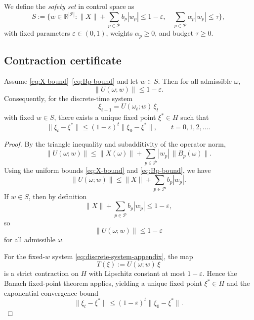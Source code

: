 \documentclass[11pt]{article}
\begin{document}
We define the \emph{safety set} in control space as
\begin{equation}
  S
  :=
  \biggl\{
    w\in\mathbb R^{|\mathcal P|}:
    \|X\| + \sum_{p\in\mathcal P} b_p |w_p| \le 1-\varepsilon,\quad
    \sum_{p\in\mathcal P} \alpha_p |w_p| \le \tau
  \biggr\},
  \label{eq:def-S}
\end{equation}
with fixed parameters $\varepsilon\in(0,1)$, weights $\alpha_p\ge 0$, and budget $\tau\ge 0$.

\subsection{Contraction certificate}

\begin{theorem}\label{thm:contraction}
Assume \eqref{eq:X-bound}--\eqref{eq:Bp-bound} and let $w\in S$. Then for all admissible $\omega$,
\begin{equation}
  \|U(\omega;w)\| \le 1-\varepsilon.
\end{equation}
Consequently, for the discrete-time system
\begin{equation}
  \xi_{t+1} = U(\omega_t;w)\,\xi_t
  \label{eq:discrete-system-appendix}
\end{equation}
with fixed $w\in S$, there exists a unique fixed point $\xi^\ast\in H$ such that
\[
\|\xi_t - \xi^\ast\|
\le (1-\varepsilon)^t \|\xi_0 - \xi^\ast\|,\qquad t=0,1,2,\dots.
\]
\end{theorem}

\begin{proof}
By the triangle inequality and subadditivity of the operator norm,
\[
\|U(\omega;w)\|
\le \|X(\omega)\| + \sum_{p\in\mathcal P} |w_p|\,\|B_p(\omega)\|.
\]
Using the uniform bounds \eqref{eq:X-bound} and \eqref{eq:Bp-bound}, we have
\[
\|U(\omega;w)\|
\le \|X\| + \sum_{p\in\mathcal P} b_p |w_p|.
\]
If $w\in S$, then by definition
\[
\|X\| + \sum_{p\in\mathcal P} b_p |w_p| \le 1 - \varepsilon,
\]
so
\[
\|U(\omega;w)\| \le 1-\varepsilon
\]
for all admissible $\omega$.

For the fixed-$w$ system \eqref{eq:discrete-system-appendix}, the map
\[
T(\xi) := U(\omega;w)\,\xi
\]
is a strict contraction on $H$ with Lipschitz constant at most $1-\varepsilon$. Hence the Banach fixed-point theorem applies, yielding a unique fixed point $\xi^\ast\in H$ and the exponential convergence bound
\[
\|\xi_t - \xi^\ast\|
\le (1-\varepsilon)^t \|\xi_0 - \xi^\ast\|.
\]
\end{proof}
\end{document}
